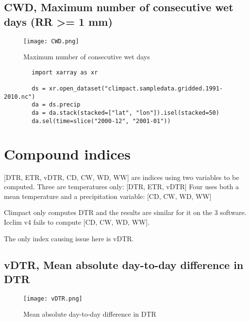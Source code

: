 \documentclass[a4paper,11pt]{article}
\begin{document}
\subsection{CWD, Maximum number of consecutive wet days (RR >= 1 mm)}
    \begin{figure}[!hbt]
        \centering
        \texttt{[image: CWD.png]}
        \caption{Maximum number of consecutive wet days}
        \label{figure/cwd}
    \end{figure}


    \begin{lstlisting}
        import xarray as xr

        ds = xr.open_dataset("climpact.sampledata.gridded.1991-2010.nc")
        da = ds.precip
        da = da.stack(stacked=["lat", "lon"]).isel(stacked=50)
        da.sel(time=slice("2000-12", "2001-01"))
    \end{lstlisting}

\section{Compound indices}
    [DTR, ETR, vDTR, CD, CW, WD, WW] are indices using two variables to be computed.
    Three are temperatures only: [DTR, ETR, vDTR]
    Four uses both a mean temperature and a precipitation variable: [CD, CW, WD, WW]

    Climpact only computes DTR and the results are similar for it on the 3 software. 
    Icclim v4 fails to compute [CD, CW, WD, WW].

    The only index causing issue here is vDTR.

    \subsection{vDTR, Mean absolute day-to-day difference in DTR}
    \begin{figure}[!hbt]
        \centering
        \texttt{[image: vDTR.png]}
        \caption{Mean absolute day-to-day difference in DTR}
        \label{figure/vdtr}
    \end{figure}
\end{document}
